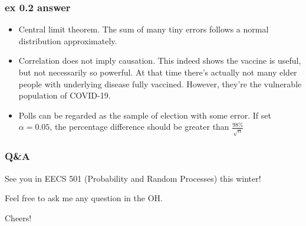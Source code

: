 \documentclass{beamer}
\begin{document}
\begin{frame}
    \frametitle{ex 0.2 answer}

    \begin{itemize}
        \item Central limit theorem. The sum of many tiny errors follows a normal distribution approximately.
        \item Correlation does not imply causation. This indeed shows the vaccine is useful, but not necessarily so powerful. At that time there's actually not many elder people with underlying disease fully vaccined. However, they're the vulnerable population of COVID-19.
        \item Polls can be regarded as the sample of election with some error. If set $\alpha=0.05$, the percentage difference should be greater than
        $\frac{98\%}{\sqrt{n}}$
    \end{itemize}

\end{frame}

\begin{frame}
    \frametitle{Q\&A}
    See you in EECS 501 (Probability and Random Processes) this winter!\par
    Feel free to ask me any question in the OH.\par
    Cheers!

\end{frame}
\end{document}
